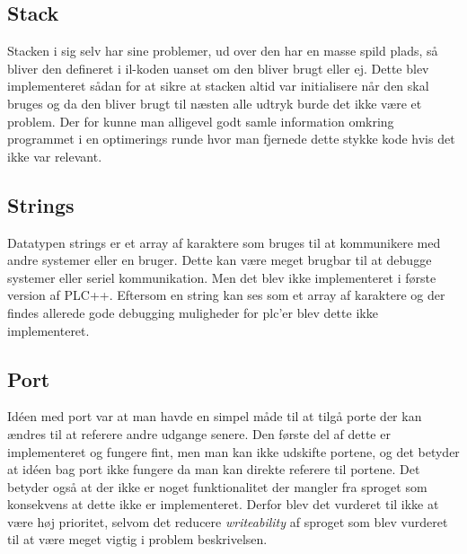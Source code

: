 \subsection*{Stack}
Stacken i sig selv har sine problemer, ud over den har en masse spild plads, så bliver den defineret i \gls{il}-koden uanset om den bliver brugt eller ej. Dette blev implementeret sådan for at sikre at stacken altid var initialisere når den skal bruges og da den bliver brugt til næsten alle udtryk burde det ikke være et problem. Der for kunne man alligevel godt samle information omkring programmet i en optimerings runde hvor man fjernede dette stykke kode hvis det ikke var relevant.

\subsection*{Strings}
Datatypen strings er et array af karaktere som bruges til at kommunikere med andre systemer eller en bruger. Dette kan være meget brugbar til at debugge systemer eller seriel kommunikation. Men det blev ikke implementeret i første version af PLC++. Eftersom en string kan ses som et array af karaktere og der findes allerede gode debugging muligheder for \gls{plc}'er blev dette ikke implementeret.

\subsection*{Port}
Idéen med port var at man havde en simpel måde til at tilgå porte der kan ændres til at referere andre udgange senere. Den første del af dette er implementeret og fungere fint, men man kan ikke udskifte portene, og det betyder at idéen bag port ikke fungere da man kan direkte referere til portene. Det betyder også at der ikke er noget funktionalitet der mangler fra sproget som konsekvens at dette ikke er implementeret. Derfor blev det vurderet til ikke at være høj prioritet, selvom det reducere \textit{writeability} af sproget som blev vurderet til at være meget vigtig i problem beskrivelsen. 